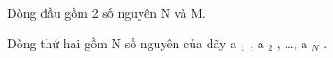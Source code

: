 Dòng đầu gồm 2 số nguyên N và M.  

   Dòng thứ hai gồm N số nguyên của dãy a   $_    1   $   , a   $_    2   $   , …, a   $_    N   $   .  

\